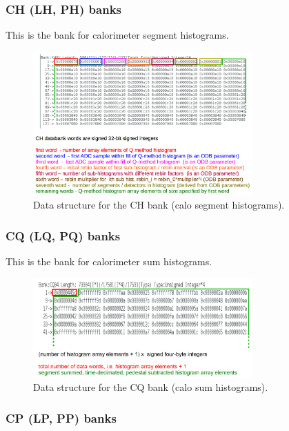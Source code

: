 \subsubsection*{CH (LH, PH) banks}

This is the bank for calorimeter segment histograms.

\begin{figure}[htbp]
\centering
\includegraphics[width=0.75\textwidth]{pics/CHBankFormat.pdf} 
\caption{Data structure for the CH bank (calo segment histograms).}\label{fig:CHBankFormat}
\end{figure}

\subsubsection*{CQ (LQ, PQ) banks}

This is the bank for calorimeter sum histograms.

\begin{figure}[htbp]
\centering
\includegraphics[width=0.75\textwidth]{pics/CQBankFormat.pdf} 
\caption{Data structure for the CQ bank (calo sum histograms).}\label{fig:CQBankFormat}
\end{figure}

\subsubsection*{CP (LP, PP) banks}

